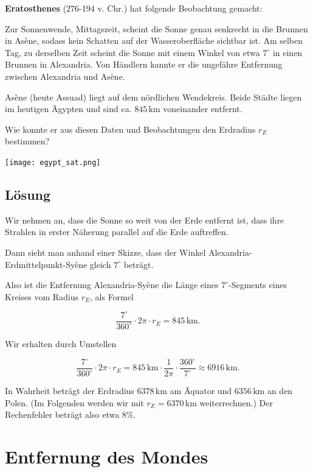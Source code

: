 \documentclass{scrartcl}
\newcommand{\RE}{r_E} %
\newcommand{\person}[1]{\textbf{#1}} %
\newcommand{\km}{\,\mathrm{km}} %
\begin{document}
  \person{Eratosthenes} (276-194 v. Chr.) hat folgende Beobachtung gemacht:

  Zur Sonnenwende, Mittagszeit, scheint die Sonne genau senkrecht in die Brunnen in Asène, sodass kein Schatten auf der Wasseroberfläche sichtbar ist.
  Am selben Tag, zu derselben Zeit scheint die Sonne mit einem Winkel von etwa $7^\circ$ in einen Brunnen in Alexandria. Von Händlern kannte er die ungefähre Entfernung zwischen Alexandria und Asène.

  Asène (heute Assuad) liegt auf dem nördlichen Wendekreis.
  Beide Städte liegen im heutigen Ägypten und sind ca. $845 \km$ voneinander entfernt.

  Wie konnte er aus diesen Daten und Beobachtungen den Erdradius $\RE$ bestimmen?


  \vspace{1em}

  \texttt{[image: egypt\_sat.png]}

  \newpage

  \subsection{Lösung}

  Wir nehmen an, dass die Sonne so weit von der Erde entfernt ist, dass ihre Strahlen in erster Näherung parallel auf die Erde auftreffen.

  Dann sieht man anhand einer Skizze, dass der Winkel Alexandria-Erdmittelpunkt-Syène gleich $7^\circ$ beträgt.

  Also ist die Entfernung Alexandria-Syène die Länge eines $7^\circ$-Segments eines Kreises vom Radius $\RE$, als Formel

  \[ \frac{7^\circ}{360^\circ} \cdot 2 \pi \cdot \RE = 845 \km. \]

  Wir erhalten durch Umstellen

  \[ \frac{7^\circ}{360^\circ} \cdot 2 \pi \cdot \RE = 845 \km \cdot \frac{1}{2 \pi} \cdot \frac{360^\circ}{7^\circ} \approx 6916\km. \]

  In Wahrheit beträgt der Erdradius $6378 \km$ am Äquator und $6356 \km$ an den Polen. (Im Folgenden werden wir mit $\RE = 6370 \km$ weiterrechnen.)
  Der Rechenfehler beträgt also etwa $8 \%$.

  \newpage
  \section{Entfernung des Mondes}
\end{document}

